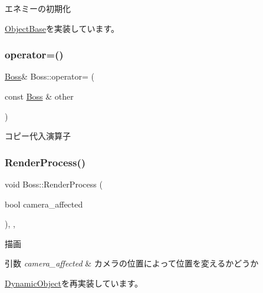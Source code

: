 エネミーの初期化 



\mbox{\hyperlink{class_object_base_af133f36f2bca1dcfd962e2cfac61ab51}{Object\+Base}}を実装しています。

\mbox{\label{class_boss_ae84c6b0e64de86f606f5ac1348045371}} 
\subsubsection{\texorpdfstring{operator=()}{operator=()}}
{\footnotesize\ttfamily \mbox{\hyperlink{class_boss}{Boss}}\& Boss\+::operator= (\begin{DoxyParamCaption}\item[{const \mbox{\hyperlink{class_boss}{Boss}} \&}]{other }\end{DoxyParamCaption})\hspace{0.3cm}{\ttfamily [inline]}}



コピー代入演算子 

\mbox{\label{class_boss_a6681bd6fc6dc35e200f9e63f196301af}} 
\subsubsection{\texorpdfstring{Render\+Process()}{RenderProcess()}}
{\footnotesize\ttfamily void Boss\+::\+Render\+Process (\begin{DoxyParamCaption}\item[{bool}]{camera\+\_\+affected }\end{DoxyParamCaption})\hspace{0.3cm}{\ttfamily [final]}, {\ttfamily [protected]}, {\ttfamily [virtual]}}



描画 


\begin{DoxyParams}{引数}
{\em camera\+\_\+affected} & カメラの位置によって位置を変えるかどうか \\
\hline
\end{DoxyParams}


\mbox{\hyperlink{class_dynamic_object_aa7488e1b4dfd7049447535d93d9d6783}{Dynamic\+Object}}を再実装しています。

\mbox{\label{class_boss_a417e06b76510146b1e6c0e6841e4463c}} 
